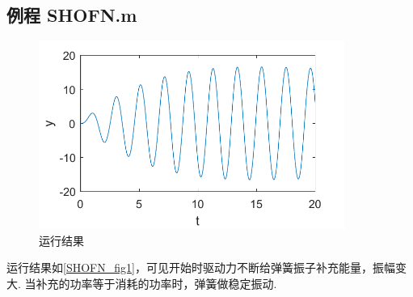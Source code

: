 \subsection{例程 SHOFN.m}

\begin{figure}[ht]
\centering
\includegraphics[width=10cm]{./figures/SHOFN.pdf}
\caption{运行结果}\label{SHOFN_fig1}
\end{figure}
%
运行结果如\autoref{SHOFN_fig1}，可见开始时驱动力不断给弹簧振子补充能量，振幅变大. 当补充的功率等于消耗的功率时，弹簧做稳定振动.













